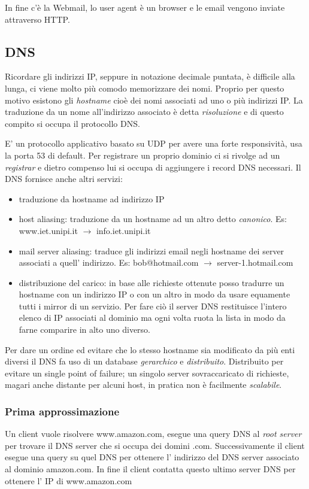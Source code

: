 In fine c'è la Webmail, lo user agent è un browser e le email vengono inviate attraverso HTTP.

\subsection{DNS}
Ricordare gli indirizzi IP, seppure in notazione decimale puntata, è difficile alla lunga, ci viene molto più comodo memorizzare dei nomi.
Proprio per questo motivo esistono gli \emph{hostname} cioè dei nomi associati ad uno o più indirizzi IP.
La traduzione da un nome all'indirizzo associato è detta \emph{risoluzione} e di questo compito si occupa il protocollo DNS.

E' un protocollo applicativo basato su UDP per avere una forte responsività, usa la porta 53 di default.
Per registrare un proprio dominio ci si rivolge ad un \emph{registrar} e dietro compenso lui si occupa di aggiungere i record DNS necessari.
Il DNS fornisce anche altri servizi:
\begin{itemize}
    \item traduzione da hostname ad indirizzo IP

    \item host aliasing: traduzione da un hostname ad un altro detto \emph{canonico}.
    Es: www.iet.unipi.it $\xrightarrow{}$ info.iet.unipi.it

    \item mail server aliasing: traduce gli indirizzi email negli hostname dei server associati a quell' indirizzo.
    Es: bob@hotmail.com $\xrightarrow{}$ server-1.hotmail.com

    \item distribuzione del carico: in base alle richieste ottenute posso tradurre un hostname con un indirizzo IP o con un altro in modo da usare equamente tutti i mirror di un servizio.
    Per fare ciò il server DNS restituisce l'intero elenco di IP associati al dominio ma ogni volta ruota la lista in modo da farne comparire in alto uno diverso.
\end{itemize}

Per dare un ordine ed evitare che lo stesso hostname sia modificato da più enti diversi il DNS fa uso di un database \emph{gerarchico} e \emph{distribuito}.
Distribuito per evitare un single point of failure; un singolo server sovraccaricato di richieste, magari anche distante per alcuni host, in pratica non è facilmente \emph{scalabile}.

\subsubsection{Prima approssimazione}
Un client vuole risolvere www.amazon.com, esegue una query DNS al \emph{root server} per trovare il DNS server che si occupa dei domini .com.
Successivamente il client esegue una query su quel DNS per ottenere l' indirizzo del DNS server associato al dominio amazon.com.
In fine il client contatta questo ultimo server DNS per ottenere l' IP di www.amazon.com


